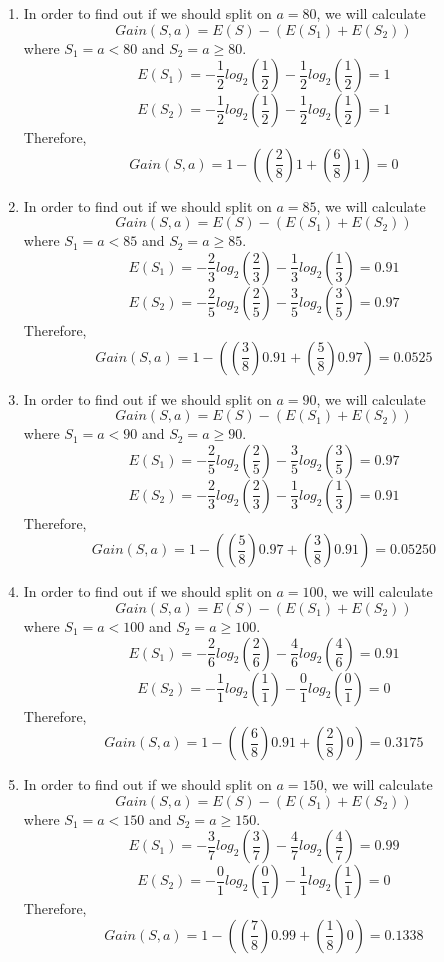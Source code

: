 \documentclass[12pt]{article}
\begin{document}
\begin{enumerate}
\begin{enumerate}
\begin{enumerate}
                \item In order to find out if we should split on $a = 80$, we will calculate \[Gain(S, a) = E(S) - (E(S_1) + E(S_2))\] 
                where $S_1 = a < 80$ and $S_2 = a \geq 80$. 
                \[E(S_1) = -\frac{1}{2}log_2(\frac{1}{2}) - \frac{1}{2}log_2(\frac{1}{2}) = 1\]
                \[E(S_2) = -\frac{1}{2}log_2(\frac{1}{2}) - \frac{1}{2}log_2(\frac{1}{2}) = 1\]
                Therefore, 
                \[Gain(S, a) = 1 - ((\frac{2}{8})1 + (\frac{6}{8})1) = 0\]
                
                \item In order to find out if we should split on $a = 85$, we will calculate \[Gain(S, a) = E(S) - (E(S_1) + E(S_2))\] 
                where $S_1 = a < 85$ and $S_2 = a \geq 85$. 
                \[E(S_1) = -\frac{2}{3}log_2(\frac{2}{3}) - \frac{1}{3}log_2(\frac{1}{3}) = 0.91\]
                \[E(S_2) = -\frac{2}{5}log_2(\frac{2}{5}) - \frac{3}{5}log_2(\frac{3}{5}) = 0.97\]
                Therefore, 
                \[Gain(S, a) = 1 - ((\frac{3}{8})0.91 + (\frac{5}{8})0.97) = 0.0525\] 
                
                
                \item In order to find out if we should split on $a = 90$, we will calculate \[Gain(S, a) = E(S) - (E(S_1) + E(S_2))\] 
                where $S_1 = a < 90$ and $S_2 = a \geq 90$. 
                \[E(S_1) = -\frac{2}{5}log_2(\frac{2}{5}) - \frac{3}{5}log_2(\frac{3}{5}) = 0.97\]
                \[E(S_2) = -\frac{2}{3}log_2(\frac{2}{3}) - \frac{1}{3}log_2(\frac{1}{3}) = 0.91\]
                Therefore, 
                \[Gain(S, a) = 1 - ((\frac{5}{8})0.97 + (\frac{3}{8})0.91) = 0.05250\]
                
                \item In order to find out if we should split on $a = 100$, we will calculate \[Gain(S, a) = E(S) - (E(S_1) + E(S_2))\] 
                where $S_1 = a < 100$ and $S_2 = a \geq 100$. 
                \[E(S_1) = -\frac{2}{6}log_2(\frac{2}{6}) - \frac{4}{6}log_2(\frac{4}{6}) = 0.91\]
                \[E(S_2) = -\frac{1}{1}log_2(\frac{1}{1}) - \frac{0}{1}log_2(\frac{0}{1}) = 0\]
                Therefore, 
                \[Gain(S, a) = 1 - ((\frac{6}{8})0.91 + (\frac{2}{8})0) = 0.3175\]
                
                \item In order to find out if we should split on $a = 150$, we will calculate \[Gain(S, a) = E(S) - (E(S_1) + E(S_2))\] 
                where $S_1 = a < 150$ and $S_2 = a \geq 150$. 
                \[E(S_1) = -\frac{3}{7}log_2(\frac{3}{7}) - \frac{4}{7}log_2(\frac{4}{7}) = 0.99\]
                \[E(S_2) = -\frac{0}{1}log_2(\frac{0}{1}) - \frac{1}{1}log_2(\frac{1}{1}) = 0\]
                Therefore, 
                \[Gain(S, a) = 1 - ((\frac{7}{8})0.99 + (\frac{1}{8})0) = 0.1338\]
                

\end{enumerate}
\end{enumerate}
\end{enumerate}
\end{document}

